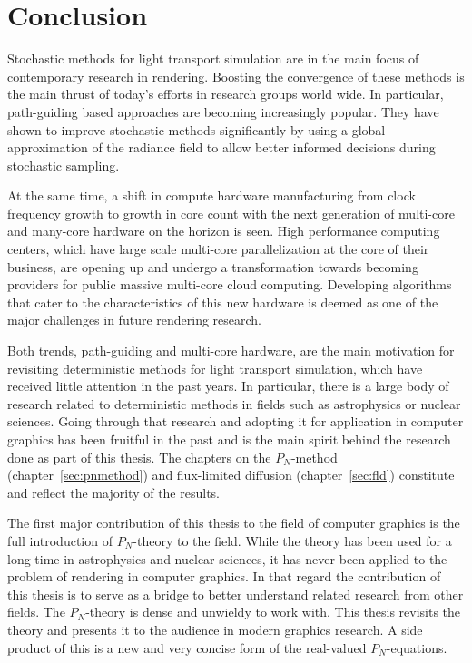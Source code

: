 \chapter{Conclusion}
%
\label{sec:conclusion}

Stochastic methods for light transport simulation are in the main focus of contemporary research in rendering. Boosting the convergence of these methods is the main thrust of today's efforts in research groups world wide. In particular, path-guiding based approaches are becoming increasingly popular. They have shown to improve stochastic methods significantly by using a global approximation of the radiance field to allow better informed decisions during stochastic sampling.

At the same time, a shift in compute hardware manufacturing from clock frequency growth to growth in core count with the next generation of multi-core and many-core hardware on the horizon is seen. High performance computing centers, which have large scale multi-core parallelization at the core of their business, are opening up and undergo a transformation towards becoming providers for public massive multi-core cloud computing. Developing algorithms that cater to the characteristics of this new hardware is deemed as one of the major challenges in future rendering research.

Both trends, path-guiding and multi-core hardware, are the main motivation for revisiting deterministic methods for light transport simulation, which have received little attention in the past years. In particular, there is a large body of research related to deterministic methods in fields such as astrophysics or nuclear sciences. Going through that research and adopting it for application in computer graphics has been fruitful in the past and is the main spirit behind the research done as part of this thesis. The chapters on the $P_N$-method (chapter~\ref{sec:pnmethod}) and flux-limited diffusion (chapter~\ref{sec:fld}) constitute and reflect the majority of the results.

The first major contribution of this thesis to the field of computer graphics is the full introduction of $P_N$-theory to the field. While the theory has been used for a long time in astrophysics and nuclear sciences, it has never been applied to the problem of rendering in computer graphics. In that regard the contribution of this thesis is to serve as a bridge to better understand related research from other fields. The $P_N$-theory is dense and unwieldy to work with. This thesis revisits the theory and presents it to the audience in modern graphics research. A side product of this is a new and very concise form of the real-valued $P_N$-equations.

